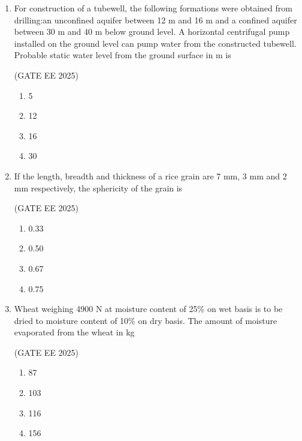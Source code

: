 \documentclass[journal,12pt,onecolumn]{IEEEtran}
\theoremstyle{remark}
\begin{document}
\begin{enumerate}
\begin{multicols}{4}
\begin{enumerate}
\item Parabolic  
\item Hyperbolic  
\item Elliptic  
\item Circular  
\end{enumerate}
\end{multicols}

\item For construction of a tubewell, the following formations were obtained from drilling:an unconfined aquifer between 12 m and 16 m and a confined aquifer between 30 m and 40 m below ground level. A horizontal centrifugal pump installed on the ground level can pump water from the constructed tubewell. Probable static water level from the ground surface in m is

\hfill(GATE EE 2025)

\begin{multicols}{4}
\begin{enumerate}
    \item 5
    \item 12
    \item 16
    \item 30
\end{enumerate}
\end{multicols}

\item If the length, breadth and thickness of a rice grain are 7 mm, 3 mm and 2 mm respectively, the sphericity of the grain is

\hfill(GATE EE 2025)

\begin{multicols}{4}
\begin{enumerate}
    \item 0.33
    \item 0.50
    \item 0.67
    \item 0.75
\end{enumerate}
\end{multicols}

\item Wheat weighing 4900 N at moisture content of 25\% on wet basis is to be dried to moisture content of 10\% on dry basis. The amount of moisture evaporated from the wheat in kg 

\hfill(GATE EE 2025)

\begin{multicols}{4}
\begin{enumerate}
    \item 87
    \item 103
    \item 116
    \item 156
\end{enumerate}
\end{multicols}


\end{enumerate}
\end{document}
